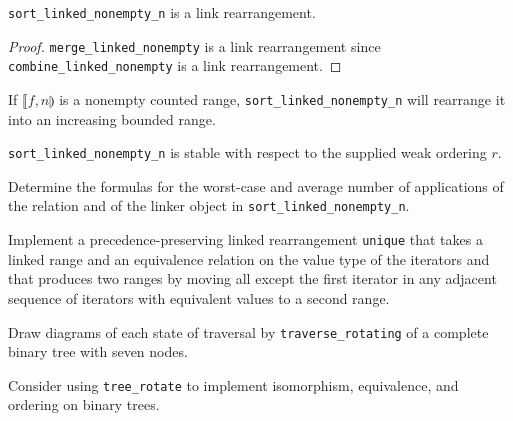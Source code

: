 \begin{lemma}
	\verb|sort_linked_nonempty_n| is a link rearrangement.
\end{lemma}

\begin{proof}
	\verb|merge_linked_nonempty| is a link rearrangement since \verb|combine_linked_nonempty| is a link
	rearrangement.
\end{proof}

\begin{lemma}
	If $\llbracket f, n \rrparenthesis$ is a nonempty counted range, \verb|sort_linked_nonempty_n| will
	rearrange it into an increasing bounded range.
\end{lemma}

\begin{lemma}
	\verb|sort_linked_nonempty_n| is stable with respect to the supplied weak ordering $r$.
\end{lemma}

\begin{exercise}
	Determine the formulas for the worst-case and average number of applications of the relation and of the
	linker object in \verb|sort_linked_nonempty_n|.
\end{exercise}

\begin{exercise}
	Implement a precedence-preserving linked rearrangement \verb|unique| that takes a linked range and an
	equivalence relation on the value type of the iterators and that produces two ranges by moving all except
	the first iterator in any adjacent sequence of iterators with equivalent values to a second range.
\end{exercise}



\begin{exercise}
	Draw diagrams of each state of traversal by \verb|traverse_rotating| of a complete binary tree with
	seven nodes.
\end{exercise}

\begin{project}
	Consider using \verb|tree_rotate| to implement isomorphism, equivalence, and ordering on binary trees.
\end{project}
